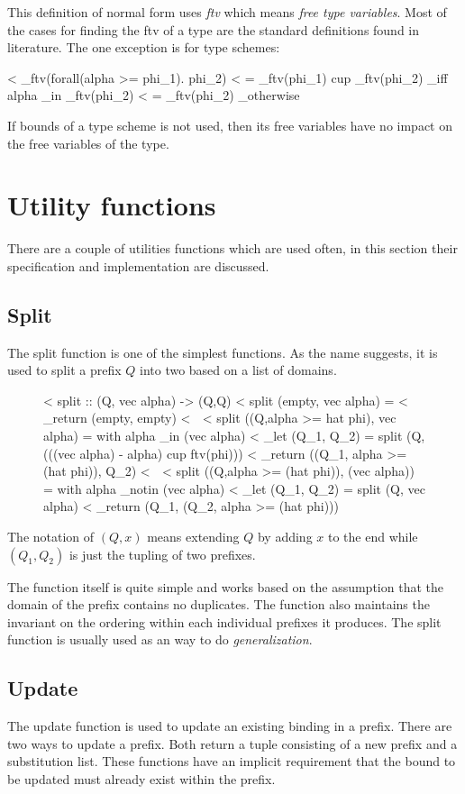 This definition of normal form uses \emph{ftv} which means \emph{free type variables}. Most of the cases for finding the ftv of a type are the standard definitions found in literature. The one exception is for type schemes:

< _ftv(forall(alpha >= phi_1). phi_2)
<    =  _ftv(phi_1) cup _ftv(phi_2)  _iff alpha _in _ftv(phi_2)
<    =  _ftv(phi_2)                  _otherwise


If bounds of a type scheme is not used, then its free variables have no impact on the free variables of the type.
\section{Utility functions}
There are a couple of utilities functions which are used often, in this section their specification and implementation are discussed.
\subsection{Split}
The split function is one of the simplest functions. As the name suggests, it is used to split a prefix $Q$ into two based on a list of domains.

\begin{figure}[H]

< split :: (Q, vec alpha) -> (Q,Q)
< split (empty, vec alpha) = 
<    _return (empty, empty)
< ^^^
< split ((Q,alpha >= hat phi), vec alpha)  =  with alpha _in (vec alpha)
<    _let (Q_1, Q_2) = split (Q,(((vec alpha) - alpha) cup ftv(phi)))
<    _return ((Q_1, alpha >= (hat phi)), Q_2)
< ^^^
< split ((Q,alpha >= (hat phi)), (vec alpha))  =  with alpha _notin (vec alpha)
<    _let (Q_1, Q_2) = split (Q, vec alpha)
<    _return (Q_1, (Q_2, alpha >= (hat phi)))

\end{figure}
The notation of $(Q,x)$ means extending $Q$ by adding $x$ to the end while $(Q_1, Q_2)$ is just the tupling of two prefixes.

The function itself is quite simple and works based on the assumption that the domain of the prefix contains no duplicates. The function also maintains the invariant on the ordering within each individual prefixes it produces. The split function is usually used as an way to do \emph{generalization}.

\subsection{Update}
The update function is used to update an existing binding in a prefix. There are two ways to update a prefix. Both return a tuple consisting of a new prefix and a substitution list. These functions have an implicit requirement that the bound to be updated must already exist within the prefix.

